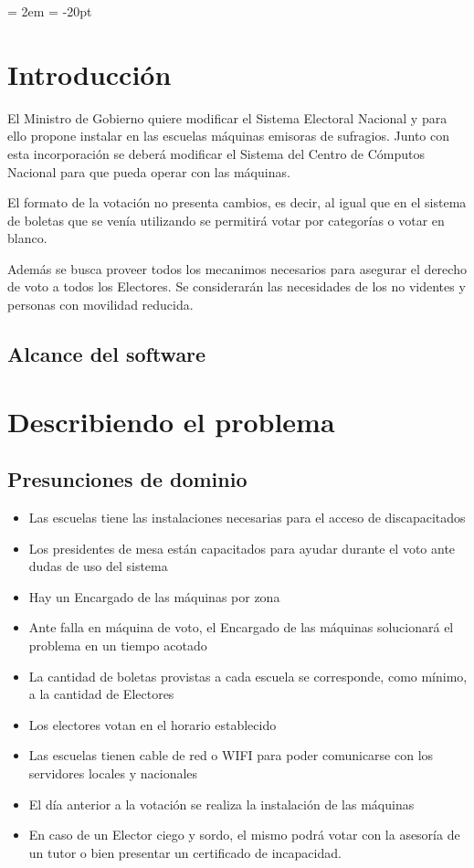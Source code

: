 \documentclass[spanish, 10pt,a4paper]{article}
\numberwithin{equation}{section} %
\begin{document}
{ \oddsidemargin = 2em
	\headheight = -20pt
	\maketitle
}
	\tableofcontents
	\newpage
\section{Introducción}
	El Ministro de Gobierno quiere modificar el Sistema Electoral Nacional y para ello propone instalar en las escuelas máquinas emisoras de sufragios. Junto con esta incorporación se deberá modificar el Sistema del Centro de Cómputos Nacional para que pueda operar con las máquinas.

	El formato de la votación no presenta cambios, es decir, al igual que en el sistema de boletas que se venía utilizando se permitirá votar por categorías o votar en blanco. 
	
	Además se busca proveer todos los mecanimos necesarios para asegurar el derecho de voto a todos los Electores. Se considerarán las necesidades de los no videntes y personas con movilidad reducida. 

\subsection{Alcance del software}

\newpage
\section{Describiendo el problema}

\subsection{Presunciones de dominio}
\begin{itemize}
\item Las escuelas tiene las instalaciones necesarias para el acceso de discapacitados
\item Los presidentes de mesa están capacitados para ayudar durante el voto ante dudas de uso del sistema
\item Hay un Encargado de las máquinas por zona
\item Ante falla en máquina de voto, el Encargado de las máquinas solucionará el problema en un tiempo acotado
\item La cantidad de boletas provistas a cada escuela se corresponde, como mínimo, a la cantidad de Electores
\item Los electores votan en el horario establecido
\item Las escuelas tienen cable de red o WIFI para poder comunicarse con los servidores locales y nacionales
\item El día anterior a la votación se realiza la instalación de las máquinas 
\item En caso de un Elector ciego y sordo, el mismo podrá votar con la asesoría de un tutor o bien presentar un certificado de incapacidad.
\end{itemize}
\end{document}
